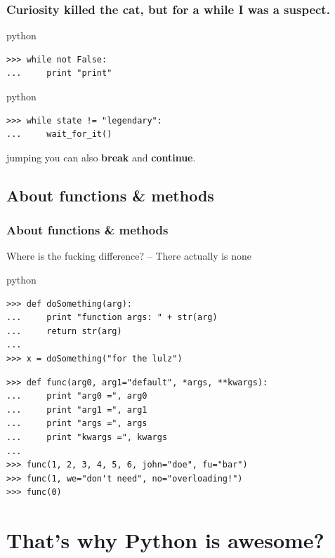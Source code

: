 \documentclass{beamer}
\begin{document}
\begin{frame}[fragile]
	\frametitle{Curiosity killed the cat, but for a \textbf{while} I was a suspect.} %

	\begin{exampleblock}{python}
	\begin{lstlisting}
>>> while not False:
...     print "print"
	\end{lstlisting}
	\end{exampleblock}
	
\pause
	
	\begin{exampleblock}{python}
	\begin{lstlisting}
>>> while state != "legendary":
...     wait_for_it()
	\end{lstlisting}
	\end{exampleblock}

\pause
	
	\begin{block}{jumping}
	you can also \textbf{break} and \textbf{continue}.
	\end{block}
\end{frame}

\subsection{About functions \& methods}
\begin{frame}[fragile]
	\frametitle{About functions \& methods}
	Where is the fucking difference? \pause -- There actually is none \pause
	\begin{exampleblock}{python}
	\begin{lstlisting}
>>> def doSomething(arg):
... 	print "function args: " + str(arg)
... 	return str(arg)
...
>>> x = doSomething("for the lulz")
	\end{lstlisting}
\pause	
	\begin{lstlisting}
>>> def func(arg0, arg1="default", *args, **kwargs):
... 	print "arg0 =", arg0
... 	print "arg1 =", arg1
... 	print "args =", args
... 	print "kwargs =", kwargs
...
>>> func(1, 2, 3, 4, 5, 6, john="doe", fu="bar")
>>> func(1, we="don't need", no="overloading!")
>>> func(0)
	\end{lstlisting}
	\end{exampleblock}
\end{frame}

\section{That's why Python is awesome?}
\end{document}
